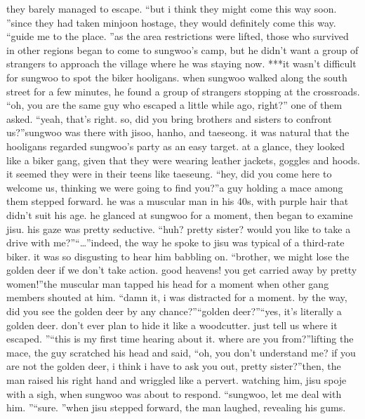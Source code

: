  they barely managed to escape.
“but i think they might come this way soon.
”since they had taken minjoon hostage, they would definitely come this way.
“guide me to the place.
”as the area restrictions were lifted, those who survived in other regions began to come to sungwoo’s camp, but he didn’t want a group of strangers to approach the village where he was staying now.
***it wasn’t difficult for sungwoo to spot the biker hooligans.
 when sungwoo walked along the south street for a few minutes, he found a group of strangers stopping at the crossroads.
“oh, you are the same guy who escaped a little while ago, right?” one of them asked.
“yeah, that’s right.
 so, did you bring brothers and sisters to confront us?”sungwoo was there with jisoo, hanho, and taeseong.
it was natural that the hooligans regarded sungwoo’s party as an easy target.
at a glance, they looked like a biker gang, given that they were wearing leather jackets, goggles and hoods.
 it seemed they were in their teens like taeseung.
“hey, did you come here to welcome us, thinking we were going to find you?”a guy holding a mace among them stepped forward.
 he was a muscular man in his 40s, with purple hair that didn’t suit his age.
he glanced at sungwoo for a moment, then began to examine jisu.
his gaze was pretty seductive.
“huh? pretty sister? would you like to take a drive with me?”“…”indeed, the way he spoke to jisu was typical of a third-rate biker.
it was so disgusting to hear him babbling on.
“brother, we might lose the golden deer if we don’t take action.
 good heavens! you get carried away by pretty women!”the muscular man tapped his head for a moment when other gang members shouted at him.
“damn it, i was distracted for a moment.
 by the way, did you see the golden deer by any chance?”“golden deer?”“yes, it’s literally a golden deer.
 don’t ever plan to hide it like a woodcutter.
 just tell us where it escaped.
”“this is my first time hearing about it.
 where are you from?”lifting the mace, the guy scratched his head and said, “oh, you don’t understand me? if you are not the golden deer, i think i have to ask you out, pretty sister?”then, the man raised his right hand and wriggled like a pervert.
watching him, jisu spoje with a sigh, when sungwoo was about to respond.
“sungwoo, let me deal with him.
”“sure.
”when jisu stepped forward, the man laughed, revealing his gums.


